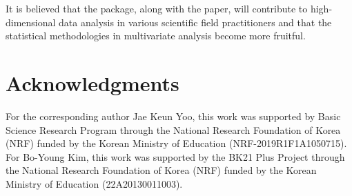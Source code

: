 It is believed that the package, along with the paper, 
will contribute to high-dimensional data analysis
in various scientific field practitioners and
that the statistical methodologies in multivariate analysis
become more fruitful.
\section{Acknowledgments}
For the corresponding author Jae Keun Yoo,
this work was supported by Basic Science Research
Program through the National Research Foundation of Korea (NRF)
funded by the Korean Ministry of Education
(NRF-2019R1F1A1050715).
For Bo-Young Kim, this work
was supported by the BK21 Plus Project through the National
Research Foundation of Korea (NRF) funded by the Korean Ministry
of Education (22A20130011003).



\address{Bo-Young Kim, Researcher\\
Celltrion\\
Incheon, 22014\\
Republic of Korea}

\address{Yunju Im, Postdoctoral Associate\\
Department of Biostatistics, Yale University\\
New Haven, CT 06520\\
United States of America}

\address{Jae Keun Yoo, Professor\\
Department of Statistics, Ewha Womans University\\
Seoul, 03760\\
Republic of Korea\\
}
